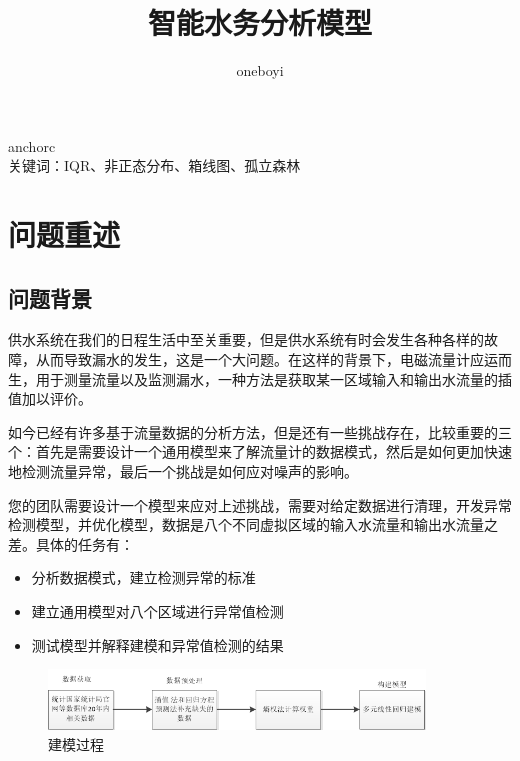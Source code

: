 \documentclass[UTF8]{article}
\begin{document}
	\title{\vspace{+10pt} \heiti \textbf {智能水务分析模型}}
	\songti
	\author{oneboyi}
	\date{}
	\maketitle  
	\section*{}
		\songti anchorc
		\\ \heiti 关键词：\songti IQR、非正态分布、箱线图、孤立森林
		\newpage
	\section{问题重述}
		\subsection{问题背景}
		\par 供水系统在我们的日程生活中至关重要，但是供水系统有时会发生各种各样的故障，从而导致漏水的发生，这是一个大问题。在这样的背景下，电磁流量计应运而生，用于测量流量以及监测漏水，一种方法是获取某一区域输入和输出水流量的插值加以评价。 
		\par 如今已经有许多基于流量数据的分析方法，但是还有一些挑战存在，比较重要的三个：首先是需要设计一个通用模型来了解流量计的数据模式，然后是如何更加快速地检测流量异常，最后一个挑战是如何应对噪声的影响。\cite[C1]{znswxxh}
		\par 您的团队需要设计一个模型来应对上述挑战，需要对给定数据进行清理，开发异常检测模型，并优化模型，数据是八个不同虚拟区域的输入水流量和输出水流量之差。具体的任务有：

		\begin{itemize}
			\item 分析数据模式，建立检测异常的标准
			\item 建立通用模型对八个区域进行异常值检测
			\item 测试模型并解释建模和异常值检测的结果
		\end{itemize}

		\begin{figure}[htb]
			\centering
			\includegraphics[width=10cm]{pictures/jmgc.png}
			\caption{建模过程}
			\label{jmgc}
		\end{figure}	
\end{document}
